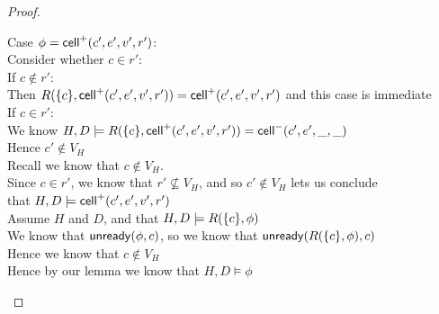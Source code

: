 \begin{proof}
\begin{itemize}
\begin{tabbedproof}
\ooo Case $\phi = \mathsf{cell}^{+}({c'}, {e'}, {v'}, {r'})$: \\
\oooo Consider whether $c \in r'$: \\
\oooo If $c \not\in r'$: \\
\ooooo Then $R(\{{c}\}, \mathsf{cell}^{+}({c'}, {e'}, {v'}, {r'})) = \mathsf{cell}^{+}({c'}, {e'}, {v'}, {r'})$ and this case is immediate \\
\oooo If $c \in r'$: \\
\ooooo We know $H, D \models R(\{{c}\}, \mathsf{cell}^{+}({c'}, {e'}, {v'}, {r'})) = \mathsf{cell}^{-}({c'}, {e'}, {\_}, {\_})$ \\
\ooooo Hence $c' \not\in V_H$ \\
\ooooo Recall we know that $c \not\in V_H$. \\ 
\ooooo Since $c \in r'$, we know that $r' \not\subseteq V_H$, and so $c' \not\in V_H$ lets us conclude \\
\ooooo that $H, D \models \mathsf{cell}^{+}({c'}, {e'}, {v'}, {r'})$ \\
\ooo Assume $H$ and $D$, and that $H, D \models R(\{{c}\}, \phi)$ \\
\ooo We know that $\mathsf{unready}({\phi}, {c})$, so we know that $\mathsf{unready}({R(\{{c}\}, \phi)}, {c})$ \\ 
\ooo Hence we know that $c \not\in V_H$ \\
\ooo Hence by our lemma we know that $H, D \models \phi$ \\
\end{tabbedproof}




\end{itemize}
\end{proof}

